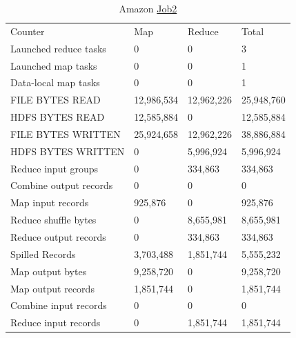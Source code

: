 \documentclass[paper=a4, fontsize=11pt]{scrartcl}	%
\numberwithin{equation}{section}															%
\numberwithin{figure}{section}																%
\numberwithin{table}{section}																%
\begin{document}
\begin{table}[!h]
	\centering
	\caption{Amazon \href{http://hadoop-compute0.di.univr.it:50030/jobdetails.jsp?jobid=job_201603141010_12297}{Job2}}
	\label{my-label}
	\begin{tabular}{llll}
		Counter	&Map	&Reduce	&Total\\
		Launched reduce tasks	&0	&0	&3\\
		Launched map tasks	    &0	&0	&1\\
		Data-local map tasks	&0	&0	&1\\
		FILE BYTES READ	        &12,986,534	&12,962,226	&25,948,760\\
		HDFS BYTES READ	        &12,585,884	&0	&12,585,884\\
		FILE BYTES WRITTEN	    &25,924,658	&12,962,226	&38,886,884\\
		HDFS BYTES WRITTEN	    &0	&5,996,924	&5,996,924\\
		Reduce input groups	    &0	&334,863	&334,863\\
		Combine output records	&0	&0	&0\\
		Map input records	    &925,876	&0	&925,876\\
		Reduce shuffle bytes	&0	&8,655,981	&8,655,981\\
		Reduce output records	&0	&334,863	&334,863\\
		Spilled Records	        &3,703,488&	1,851,744&	5,555,232\\
		Map output bytes	    &9,258,720&	0	&9,258,720\\
		Map output records	    &1,851,744&	0	&1,851,744\\
		Combine input records	&0	&0&	0\\
		Reduce input records	&0	&1,851,744	&1,851,744\\
		
	\end{tabular}
\end{table}
\end{document}
